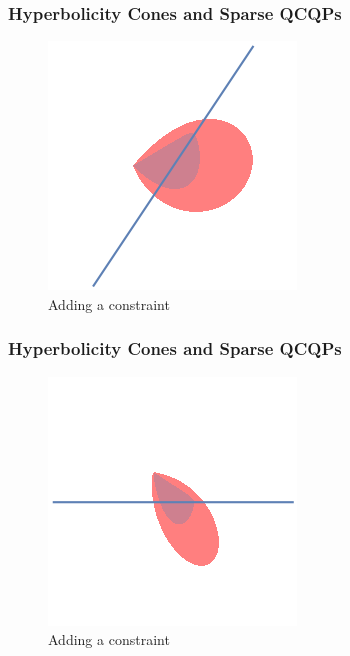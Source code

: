\documentclass{beamer}
\begin{document}
\begin{frame}
    \frametitle{Hyperbolicity Cones and Sparse QCQPs}
    \begin{figure}[htpb]
        \centering
        \includegraphics[width=0.6\linewidth]{comparison_line.png}
        \caption{Adding a constraint}%
        \label{fig:comparison_line}
    \end{figure}
\end{frame}
\begin{frame}
    \frametitle{Hyperbolicity Cones and Sparse QCQPs}
    \begin{figure}[htpb]
        \centering
        \includegraphics[width=0.6\linewidth]{comparison_line_rotated.png}
        \caption{Adding a constraint}%
        \label{fig:comparison_line}
    \end{figure}
\end{frame}
\end{document}
